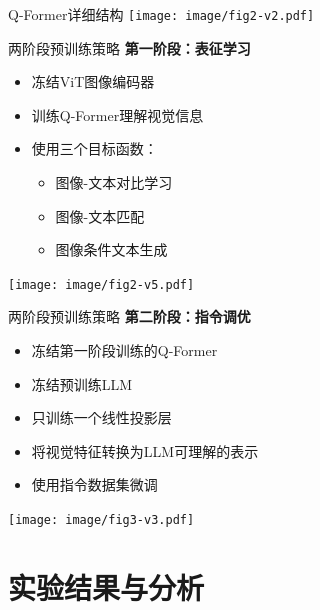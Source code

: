 \documentclass{beamer}
\begin{document}
\begin{frame}{Q-Former详细结构}
    \centering
    \texttt{[image: image/fig2-v2.pdf]}
    \vspace{0.2cm}
    \\
    \caption{Q-Former的内部结构与注意力机制}
  \end{frame}

\begin{frame}{两阶段预训练策略}
    \centering
    \textbf{第一阶段：表征学习}
    \begin{itemize}
        \item 冻结ViT图像编码器
        \item 训练Q-Former理解视觉信息
        \item 使用三个目标函数：
            \begin{itemize}
                \item 图像-文本对比学习
                \item 图像-文本匹配
                \item 图像条件文本生成
            \end{itemize}
    \end{itemize}
    \vspace{0.5cm}
    \texttt{[image: image/fig2-v5.pdf]}
    \\
    \caption*{第一阶段的预训练任务}
\end{frame}

\begin{frame}{两阶段预训练策略}
    \centering
    \textbf{第二阶段：指令调优}
    \begin{itemize}
        \item 冻结第一阶段训练的Q-Former
        \item 冻结预训练LLM
        \item 只训练一个线性投影层
        \item 将视觉特征转换为LLM可理解的表示
        \item 使用指令数据集微调
    \end{itemize}
    \vspace{0.5cm}
    \texttt{[image: image/fig3-v3.pdf]}
    \\
    \caption*{第二阶段的预训练任务}
\end{frame}



\section{实验结果与分析}
\end{document}
